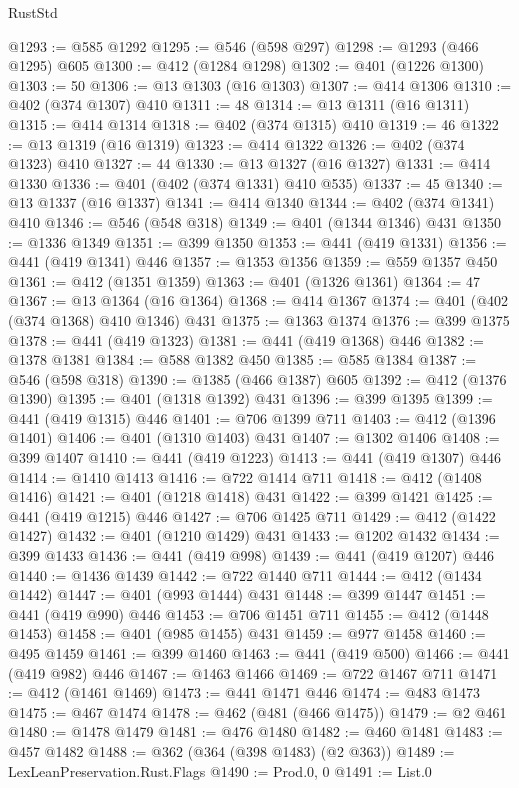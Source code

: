 \begin{lexlean}{RustStd}
\begin{coremodule}
@1293 := @585 @1292
@1295 := @546 (@598 @297)
@1298 := @1293 (@466 @1295) @605
@1300 := @412 (@1284 @1298)
@1302 := @401 (@1226 @1300)
@1303 := 50
@1306 := @13 @1303 (@16 @1303)
@1307 := @414 @1306
@1310 := @402 (@374 @1307) @410
@1311 := 48
@1314 := @13 @1311 (@16 @1311)
@1315 := @414 @1314
@1318 := @402 (@374 @1315) @410
@1319 := 46
@1322 := @13 @1319 (@16 @1319)
@1323 := @414 @1322
@1326 := @402 (@374 @1323) @410
@1327 := 44
@1330 := @13 @1327 (@16 @1327)
@1331 := @414 @1330
@1336 := @401 (@402 (@374 @1331) @410 @535)
@1337 := 45
@1340 := @13 @1337 (@16 @1337)
@1341 := @414 @1340
@1344 := @402 (@374 @1341) @410
@1346 := @546 (@548 @318)
@1349 := @401 (@1344 @1346) @431
@1350 := @1336 @1349
@1351 := @399 @1350
@1353 := @441 (@419 @1331)
@1356 := @441 (@419 @1341) @446
@1357 := @1353 @1356
@1359 := @559 @1357 @450
@1361 := @412 (@1351 @1359)
@1363 := @401 (@1326 @1361)
@1364 := 47
@1367 := @13 @1364 (@16 @1364)
@1368 := @414 @1367
@1374 := @401 (@402 (@374 @1368) @410 @1346) @431
@1375 := @1363 @1374
@1376 := @399 @1375
@1378 := @441 (@419 @1323)
@1381 := @441 (@419 @1368) @446
@1382 := @1378 @1381
@1384 := @588 @1382 @450
@1385 := @585 @1384
@1387 := @546 (@598 @318)
@1390 := @1385 (@466 @1387) @605
@1392 := @412 (@1376 @1390)
@1395 := @401 (@1318 @1392) @431
@1396 := @399 @1395
@1399 := @441 (@419 @1315) @446
@1401 := @706 @1399 @711
@1403 := @412 (@1396 @1401)
@1406 := @401 (@1310 @1403) @431
@1407 := @1302 @1406
@1408 := @399 @1407
@1410 := @441 (@419 @1223)
@1413 := @441 (@419 @1307) @446
@1414 := @1410 @1413
@1416 := @722 @1414 @711
@1418 := @412 (@1408 @1416)
@1421 := @401 (@1218 @1418) @431
@1422 := @399 @1421
@1425 := @441 (@419 @1215) @446
@1427 := @706 @1425 @711
@1429 := @412 (@1422 @1427)
@1432 := @401 (@1210 @1429) @431
@1433 := @1202 @1432
@1434 := @399 @1433
@1436 := @441 (@419 @998)
@1439 := @441 (@419 @1207) @446
@1440 := @1436 @1439
@1442 := @722 @1440 @711
@1444 := @412 (@1434 @1442)
@1447 := @401 (@993 @1444) @431
@1448 := @399 @1447
@1451 := @441 (@419 @990) @446
@1453 := @706 @1451 @711
@1455 := @412 (@1448 @1453)
@1458 := @401 (@985 @1455) @431
@1459 := @977 @1458
@1460 := @495 @1459
@1461 := @399 @1460
@1463 := @441 (@419 @500)
@1466 := @441 (@419 @982) @446
@1467 := @1463 @1466
@1469 := @722 @1467 @711
@1471 := @412 (@1461 @1469)
@1473 := @441 @1471 @446
@1474 := @483 @1473
@1475 := @467 @1474
@1478 := @462 (@481 (@466 @1475))
@1479 := @2 @461
@1480 := @1478 @1479
@1481 := @476 @1480
@1482 := @460 @1481
@1483 := @457 @1482
@1488 := @362 (@364 (@398 @1483) (@2 @363))
@1489 := LexLeanPreservation.Rust.Flags
@1490 := Prod.{0, 0}
@1491 := List.{0}

\end{coremodule}
\end{lexlean}

